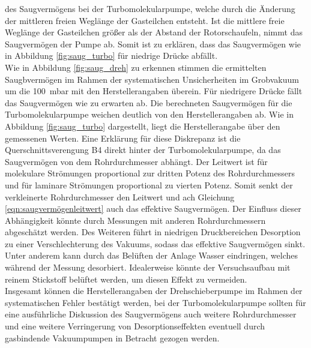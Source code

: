 des Saugvermögens bei der Turbomolekularpumpe, welche durch die Änderung der mittleren freien
Weglänge der Gasteilchen entsteht. Ist die mittlere freie Weglänge der Gasteilchen
größer als der Abstand der Rotorschaufeln, nimmt das Saugvermögen der Pumpe ab. Somit ist zu 
erklären, dass das Saugvermögen wie in Abbildung \ref{fig:saug_turbo} für niedrige Drücke 
abfällt.
\\
Wie in Abbildung \ref{fig:saug_dreh} zu erkennen stimmen die ermittelten Saugbvermögen im Rahmen 
der systematischen Unsicherheiten im Grobvakuum um die \SI{100}{\milli\bar} mit den Herstellerangaben 
überein. Für niedrigere Drücke fällt das Saugvermögen wie zu erwarten ab. 
Die berechneten Saugvermögen für die Turbomolekularpumpe weichen deutlich von den Herstellerangaben
ab. Wie in Abbildung \ref{fig:saug_turbo} dargestellt, liegt die Herstellerangabe über den gemessenen Werten.
Eine Erklärung für diese Diskrepanz ist die Querschnittsverengung B4 direkt hinter der Turbomolekularpumpe,
da das Saugvermögen von dem Rohrdurchmesser abhängt.
Der Leitwert ist für molekulare Strömungen proportional zur dritten Potenz des Rohrdurchmessers und für 
laminare Strömungen proportional zu vierten Potenz. 
Somit senkt der verkleinerte Rohrdurchmesser den Leitwert und ach Gleichung \ref{eqn:saugvermögenleitwert} 
auch das effektive Saugvermögen. Der Einfluss dieser Abhängigkeit könnte 
durch Messungen mit anderen Rohrdurchmessern abgeschätzt werden. 
Des Weiteren führt in niedrigen Druckbereichen Desorption zu einer Verschlechterung des Vakuums, sodass
das effektive Saugvermögen sinkt. Unter anderem kann durch das Belüften der Anlage Wasser eindringen, 
welches während der Messung desorbiert. Idealerweise könnte der Versuchsaufbau mit reinem Stickstoff 
belüftet werden, um diesen Effekt zu vermeiden.
\\
Insgesamt können die Herstellerangaben der Drehschieberpumpe im Rahmen der systematischen Fehler 
bestätigt werden, bei der Turbomolekularpumpe sollten für eine ausführliche Diskussion des 
Saugvermögens auch weitere Rohrdurchmesser und eine weitere Verringerung von Desorptionseffekten 
eventuell durch gasbindende Vakuumpumpen in Betracht gezogen werden.
\newpage